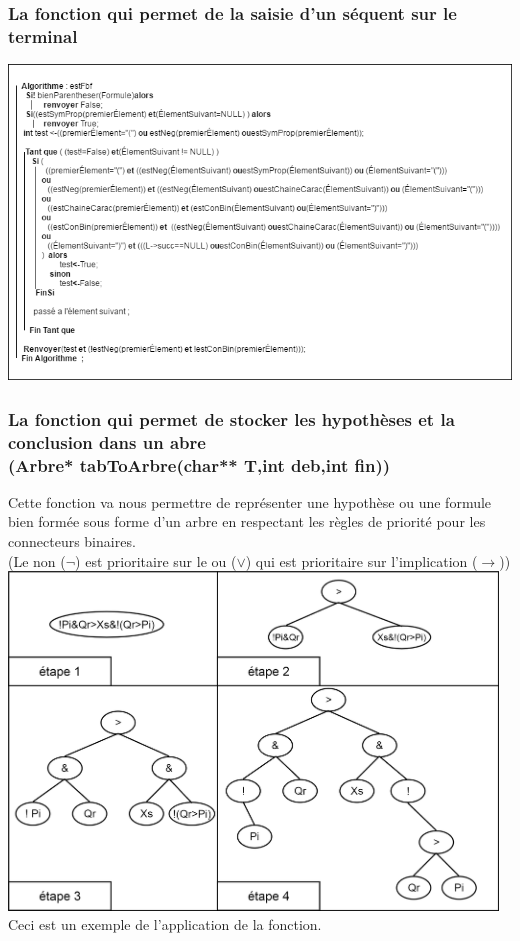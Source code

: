 \documentclass[a4paper,12pt]{article}
\begin{document}
\subsubsection{La fonction qui permet de la saisie d'un séquent sur le terminal}
\includegraphics[width=150mm]{pm.png}
\subsubsection{La fonction qui permet de stocker les hypothèses et la conclusion  dans un abre \\ (Arbre* tabToArbre(char** T,int deb,int fin))}
Cette fonction va nous permettre de représenter une hypothèse ou une formule bien formée sous forme d'un arbre en respectant les règles de priorité pour les connecteurs binaires.\\
(Le non ($\neg$) est prioritaire sur le ou ($\vee$) qui est prioritaire sur l'implication ($\rightarrow$))\\

\includegraphics[width=130mm]{io.png}\\
Ceci est un exemple de l'application de la fonction.
\end{document}
